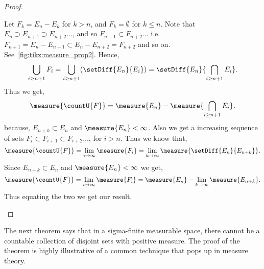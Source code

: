 \begin{proof}
\begin{enumerate}
	   Let $F_k = E_n - E_k$ for $k > n$, and $F_k = \emptyset$ for $k \leq n$. 
	   Note that $E_n \supset E_{n+1} \supset E_{n+2} \dots$, 
	   and so $F_{n+1} \subset F_{n+2} \dots$ i.e.~$F_{n+1} = E_n - E_{n+1} \subset E_n -
	   E_{n+2} = F_{n+2}$ and so on. See~\ref{fig:tikz:measure_prop2}. Hence,
	   \[\bigcup\limits_{i \geq n+1} F_i = \bigcup\limits_{i \geq n+1}(\setDiff{E_n}{E_i}) =
	       \setDiff{E_n}{\bigcap\limits_{i \geq n+1}E_i}.\]
	   Thus we get,
	   \[\measure{\countU{F}} = \measure{E_n} - \measure{\bigcap\limits_{i \geq n+1}E_i}.\]
	   because, $E_{n+k} \subset E_n$ and $\measure{E_n} < \infty$.
	   Also we get a increasing sequence of sets $F_{i} \subset
	   F_{i+1} \subset F_{i+2} \dots$, for $i > n$. Thus we know that,
	   \[\measure{\countU{F}} = \lim\limits_{i\to\infty}\measure{F_i} = \lim\limits_{k\to\infty}
	       \measure{\setDiff{E_n}{E_{n+k}}}.\]
	   Since $E_{n+k} \subset E_n$ and $\measure{E_n} < \infty$ we get,
	  \[\measure{\countU{F}} = \lim\limits_{i\to\infty}\measure{F_i} = 
	      \measure{E_n} - \lim\limits_{k\to\infty}\measure{E_{n+k}}.\]
	  Thus equating the two we get our result.
 
    \end{enumerate}
\end{proof}
The next theorem says that in a sigma-finite measurable space, there cannot be a countable collection of
disjoint sets with positive measure. The proof of the theorem is highly illustrative of a common technique
that pops up in measure theory. 

